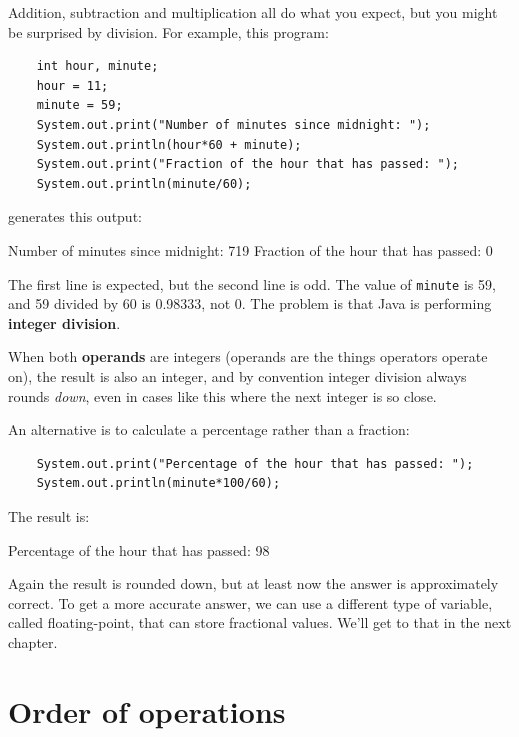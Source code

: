 \documentclass[12pt]{book}
\theoremstyle{exercise}
\begin{document}

Addition, subtraction and multiplication all do what you
expect, but you might be surprised by division.  For example,
this program:

\begin{lstlisting}
    int hour, minute;
    hour = 11;
    minute = 59;
    System.out.print("Number of minutes since midnight: ");
    System.out.println(hour*60 + minute);
    System.out.print("Fraction of the hour that has passed: ");
    System.out.println(minute/60);
\end{lstlisting}
%
generates this output:

\begin{verbatimtab}
Number of minutes since midnight: 719
Fraction of the hour that has passed: 0
\end{verbatimtab}
%
The first line is expected, but the second line is
odd.  The value of {\tt minute} is 59, and
59 divided by 60 is 0.98333, not 0.  The problem is that
Java is performing {\bf integer division}.


When both {\bf operands} are integers (operands are the things
operators operate on), the result is also an integer,
and by convention integer division always rounds {\em down},
even in cases like this where the next integer is so close.

An alternative is to calculate a percentage
rather than a fraction:

\begin{lstlisting}
    System.out.print("Percentage of the hour that has passed: ");
    System.out.println(minute*100/60);
\end{lstlisting}
%
The result is:

\begin{verbatimtab}
Percentage of the hour that has passed: 98
\end{verbatimtab}
%
Again the result is rounded down, but at least now the answer
is approximately correct.  To get a more accurate
answer, we can use a different type of variable, called
floating-point, that can store fractional values.
We'll get to that in the next chapter.


\section{Order of operations}
\end{document}
